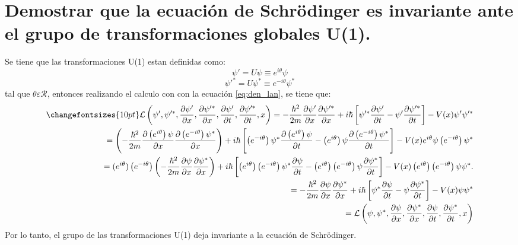 \section{Demostrar que la ecuación de Schr\"odinger es invariante ante el grupo de transformaciones globales U(1).}
Se tiene que las transformaciones U(1) estan definidas como:
\begin{equation}
   {\psi}'= U\psi \equiv e^{i\theta}\psi
   \label{eq:operador_u}
\end{equation}
\begin{equation}
    {\psi}'^*= U\psi^* \equiv e^{-i\theta}\psi^*
\end{equation}
tal que $\theta \varepsilon \mathcal{R}$, entonces realizando el calculo con con la ecuación \ref{eq:den_lan}, se tiene que:
\begin{eqnarray*}
    \changefontsizes{10pt}
    \mathcal{L}\left({\psi}',{\psi}'^*,\frac{\partial {\psi}'}{\partial x},\frac{\partial {\psi}'^*}{\partial x},\frac{\partial {\psi}'}{\partial t},\frac{\partial {\psi}'^*}{\partial t},x\right) = -\frac{\hbar^2}{2m} \frac{\partial {\psi}'}{\partial x} \frac{\partial {\psi}'^*}{\partial x}+i\hbar \left[ {\psi}'^* \frac{\partial {\psi}'}{\partial t} - {\psi}' \frac{\partial {\psi}'^*}{\partial t} \right] -V(x){\psi}' {\psi}'^*\\
    =\left(- \frac{\hbar^2}{2m} \frac{\partial \left(e^{i\theta}\right)\psi}{\partial x}\frac{\partial \left(e^{-i\theta}\right)\psi^*}{\partial x}\right) +i\hbar \left[ \left(e^{-i\theta}\right)\psi^* \frac{\partial \left(e^{i\theta}\right)\psi}{\partial t} - \left(e^{i\theta}\right)\psi \frac{\partial \left(e^{-i\theta}\right)\psi^*}{\partial t} \right] - V(x) e^{i\theta}\psi \left(e^{-i\theta}\right)\psi^*\\
    =(e^{i\theta})\left(e^{-i\theta}\right)\left(-\frac{\hbar^2}{2m} \frac{\partial \psi}{\partial x} \frac{\partial \psi^*}{\partial x}\right)+i\hbar \left[\left(e^{i\theta}\right)\left(e^{-i\theta}\right) \psi^* \frac{\partial \psi}{\partial t} -\left(e^{i\theta}\right)\left(e^{-i\theta}\right) \psi \frac{\partial \psi^*}{\partial t} \right] -V(x)\left(e^{i\theta}\right)\left(e^{-i\theta}\right)\psi \psi^*.\\
    =-\frac{\hbar^2}{2m} \frac{\partial \psi}{\partial x} \frac{\partial \psi^*}{\partial x}+i\hbar \left[ \psi^* \frac{\partial \psi}{\partial t} - \psi \frac{\partial \psi^*}{\partial t} \right] -V(x)\psi \psi^*\\
    =\mathcal{L}\left(\psi,\psi^*,\frac{\partial \psi}{\partial x},\frac{\partial \psi^*}{\partial x},\frac{\partial \psi}{\partial t},\frac{\partial \psi^*}{\partial t},x\right)
\end{eqnarray*}
Por lo tanto, el grupo de las transformaciones U(1) deja invariante a la ecuación de Schr\"odinger.